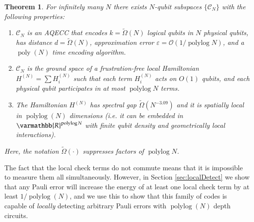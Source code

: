 \documentclass[11pt,letterpaper]{article}
\newtheorem{theorem}{Theorem}[section]
\theoremstyle{definition}
\theoremstyle{remark}
\let\mathbb\varmathbb
\DeclareMathOperator{\poly}{poly}
\DeclareMathOperator{\polylog}{polylog}
\newcommand{\cC}{\mathcal C}
\newcommand{\cO}{\mathcal O}
\numberwithin{equation}{section}
\theoremstyle{definition}
\begin{document}
\begin{theorem}%
\label{thm:informalMain}
%
For infinitely many $N$ there exists $N$-qubit subspaces $\{\cC_N\}$ with the following properties:
\begin{enumerate}
  \item $\cC_N$ is an AQECC that encodes $k = \tilde{\Omega}(N)$ logical qubits in $N$ physical qubits, has distance $d = \tilde{\Omega}(N)$, approximation error $\varepsilon = \cO(1/\polylog N)$, and a $\poly(N)$ time encoding algorithm.
  \item $\cC_N$ is the ground space of a frustration-free local Hamiltonian $H^{(N)} = \sum H_i^{(N)}$ such that each term $H_i^{(N)}$ acts on $O(1)$ qubits, and each physical qubit participates in at most $\polylog N$ terms. 
  \item The Hamiltonian $H^{(N)}$ has spectral gap $\tilde{\Omega}(N^{-3.09})$ and it is spatially local in $\polylog(N)$ dimensions (i.e. it can be embedded in $\mathbb{R}^{\polylog N}$ with finite qubit density and geometrically local interactions). 
\end{enumerate}
Here, the notation $\tilde{\Omega}(\cdot)$ suppresses factors of $\polylog N$.
\end{theorem} 
The fact that the local check terms do not commute means that it is impossible to measure them all simultaneously.  However, in Section \ref{sec:localDetect} we show that any Pauli error will increase the energy of at least one local check term by at least $1/\polylog(N)$, and we use this to show that this family of codes is capable of \emph{locally} detecting arbitrary Pauli errors with $\polylog(N)$ depth circuits.
\end{document}

